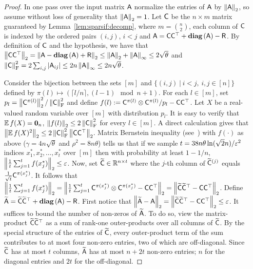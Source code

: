 \begin{proof}
In one pass over the input matrix ${\mathsf{A} }$ normalize the entries of ${\mathsf{A} }$ by $\left\|{\mathsf{A} }\right\|_2$, so assume without loss of generality that $\left\|{\mathsf{A} }\right\|_2=1$. Let ${\mathsf{C} }$ be the $n\times m$ matrix guaranteed by Lemma~\ref{lem:sparsif:decomp}, where $m= \binom{n}{2}$, each column of ${\mathsf{C} }$ is indexed by the ordered pairs $(i,j)$, $i<j$ and ${\mathsf{A} } = {\mathsf{C} }{\mathsf{C} }^\top +\operatorname{\textbf{diag}}\left({\mathsf{A} }\right) - {\mathsf{R} }$. By definition of ${\mathsf{C} }$ and the hypothesis, we have that $\left\|{\mathsf{C} }{\mathsf{C} }^\top\right\|_2 = \left\|{\mathsf{A} } - \operatorname{\textbf{diag}}\left({\mathsf{A} }\right) +{\mathsf{R} }\right\|_2 \leq \left\|{\mathsf{A} }\right\|_2 +\left\|{\mathsf{A} }\right\|_\infty\leq 2\sqrt{\theta}$ and $\left\|{\mathsf{C} }\right\|_{\textrm{F}}^2 =2 \sum_{i,j} |{\mathsf{A} }_{ij}| \leq 2 n \left\|{\mathsf{A} }\right\|_\infty\leq 2n \sqrt{\theta} $.
%

%
Consider the bijection between the sets $[m]$ and $\{(i,j)\ |\ i<j,\ i,j\in{[n]}\}$ defined by $\pi (l)  \mapsto ( \lceil l / n\rceil , (l-1) \mod n + 1) $. For each $l\in{[m]}$, set $p_l=\left\|{\mathsf{C} }^{\pi (l)}\right\|_2^2 / \left\|{\mathsf{C} }\right\|_{\textrm{F}}^2$ and define $f(l):= {\mathsf{C} }^{\pi(l)} \otimes {\ensuremath{\mathsf{C} }}^{\pi(l)}/p_l - {\mathsf{C} }{\mathsf{C} }^\top$. Let $X$ be a real-valued random variable over $[m]$ with distribution $p_l$. It is easy to verify that $\operatorname{\mathbb{E}}{f(X)} = \mathbf{0}_n$, $\left\|f(l)\right\|_2 \leq 2 \left\|{\mathsf{C} }\right\|_{\textrm{F}}^2$ for every $l\in{[m]}$. A direct calculation gives that $\left\|\operatorname{\mathbb{E}}{ f(X)^2}\right\|_2 \leq 2\left\|{\mathsf{C} }\right\|_{\textrm{F}}^2\left\|{\mathsf{C} }{\mathsf{C} }^\top\right\|_2$. Matrix Bernstein inequality (see~\cite{chernoff:matrix_valued:Tropp}) with $f(\cdot)$ as above ($\gamma = 4n\sqrt{\theta}$ and $\rho^2 = 8 n \theta$) tells us that if we sample $t=38 n\theta \ln(\sqrt{2}n) /\varepsilon^2 $ indices $x_1^*, x_2^*,\ldots , x_t^*$ over $[m]$ then with probability at least $1-1/n$, $\left\| \frac1{t} \sum_{j=1}^{t} f(x_j^*)\right\|_2 \leq \varepsilon$. Now, set $\widetilde{{\mathsf{C} }}\in\mathbb{R}^{n\times t}$ where the $j$-th column of $\widetilde{{\mathsf{C} }}^{(j)}$ equals $\frac1{\sqrt{t}} {\mathsf{C} }^{\pi(x_j^*)}$. It follows that $\left\| \frac1{t} \sum_{j=1}^{t} f(x_j^*)\right\|_2 = \left\| \frac1{t} \sum_{j=1}^{t} {\mathsf{C} }^{\pi(x_j^*)} \otimes {\ensuremath{\mathsf{C} }}^{\pi(x_j^*)} - {\mathsf{C} }{\mathsf{C} }^\top\right\|_2 = \left\|\widetilde{{\mathsf{C} }}\widetilde{{\mathsf{C} }}^\top - {\mathsf{C} }{\mathsf{C} }^\top\right\|_2$. Define $\widetilde{{\mathsf{A} }} = \widetilde{{\mathsf{C} }}\widetilde{{\mathsf{C} }}^\top +\operatorname{\textbf{diag}}\left({\mathsf{A} }\right) - {\mathsf{R} } $. First notice that $\left\|\widetilde{{\mathsf{A} }} - {\mathsf{A} }\right\|_2 = \left\|\widetilde{{\mathsf{C} }} \widetilde{{\mathsf{C} }}^\top -{\mathsf{C} }{\mathsf{C} }^\top\right\|_2 \leq \varepsilon$. It suffices to bound the number of non-zeros of $\widetilde{{\mathsf{A} }}$. To do so, view the matrix-product $\widetilde{{\mathsf{C} }}\widetilde{{\mathsf{C} }}^\top$ as a sum of rank-one outer-products over all columns of $\widetilde{{\mathsf{C} }}$. By the special structure of the entries of $\widetilde{{\mathsf{C} }}$, every outer-product term of the sum contributes to at most four non-zero entries, two of which are off-diagonal. Since $\widetilde{{\mathsf{C} }}$ has at most $t$ columns, $\widetilde{{\mathsf{A} }}$ has at most $n + 2t$ non-zero entries; $n$ for the diagonal entries and $2t$ for the off-diagonal.
\end{proof}

